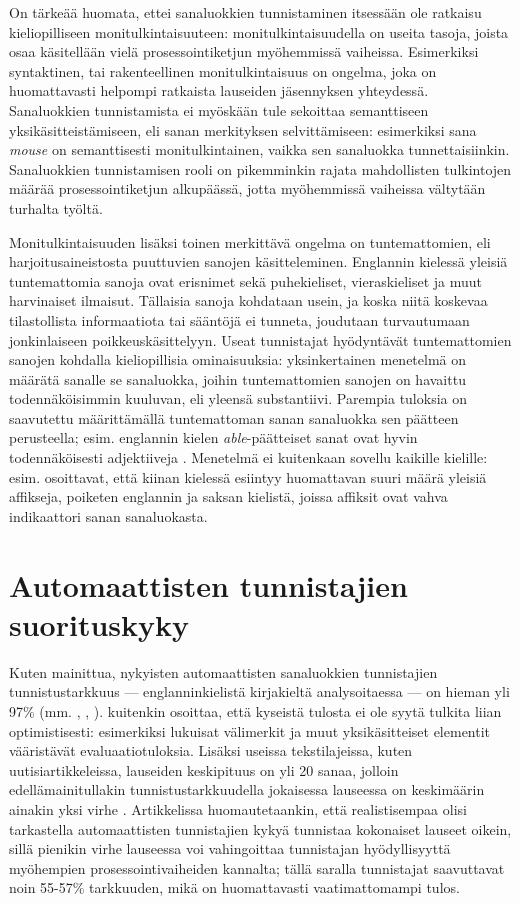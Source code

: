 \documentclass[utf8,bachelor,manualbib]{gradu3}
\begin{document}
On tärkeää huomata, ettei sanaluokkien tunnistaminen itsessään ole ratkaisu kieliopilliseen monitulkintaisuuteen: monitulkintaisuudella on useita tasoja, joista osaa käsitellään vielä prosessointiketjun myöhemmissä vaiheissa. Esimerkiksi syntaktinen, tai rakenteellinen monitulkintaisuus on ongelma, joka on huomattavasti helpompi ratkaista lauseiden jäsennyksen yhteydessä. Sanaluokkien tunnistamista ei myöskään tule sekoittaa semanttiseen yksikäsitteistämiseen, eli sanan merkityksen selvittämiseen: esimerkiksi sana \textit{mouse} on semanttisesti monitulkintainen, vaikka sen sanaluokka tunnettaisiinkin. Sanaluokkien tunnistamisen rooli on pikemminkin rajata mahdollisten tulkintojen määrää prosessointiketjun alkupäässä, jotta myöhemmissä vaiheissa vältytään turhalta työltä.

Monitulkintaisuuden lisäksi toinen merkittävä ongelma on tuntemattomien, eli harjoitusaineistosta puuttuvien sanojen käsitteleminen. Englannin kielessä yleisiä tuntemattomia sanoja ovat erisnimet sekä puhekieliset, vieraskieliset ja muut harvinaiset ilmaisut. Tällaisia sanoja kohdataan usein, ja koska niitä koskevaa tilastollista informaatiota tai sääntöjä ei tunneta, joudutaan turvautumaan jonkinlaiseen poikkeuskäsittelyyn. Useat tunnistajat hyödyntävät tuntemattomien sanojen kohdalla kieliopillisia ominaisuuksia: yksinkertainen menetelmä on määrätä sanalle se sanaluokka, joihin tuntemattomien sanojen on havaittu todennäköisimmin kuuluvan, eli yleensä substantiivi. Parempia tuloksia on saavutettu määrittämällä tuntemattoman sanan sanaluokka sen päätteen perusteella; esim. englannin kielen \emph{able}-päätteiset sanat ovat hyvin todennäköisesti adjektiiveja \citep{samuelsson1993}. Menetelmä ei kuitenkaan sovellu kaikille kielille: esim. \citet{tseng2005} osoittavat, että kiinan kielessä esiintyy huomattavan suuri määrä yleisiä affikseja, poiketen englannin ja saksan kielistä, joissa affiksit ovat vahva indikaattori sanan sanaluokasta.


\section{Automaattisten tunnistajien suorituskyky}

Kuten mainittua, nykyisten automaattisten sanaluokkien tunnistajien tunnistustarkkuus --- englanninkielistä kirjakieltä analysoitaessa --- on hieman yli 97\%  (mm. \citealp{toutanova2003}, \citealp{shen2007}, \citealp{spoustova2009}). \citet{manning2011} kuitenkin osoittaa, että kyseistä tulosta ei ole syytä tulkita liian optimistisesti: esimerkiksi lukuisat välimerkit ja muut yksikäsitteiset elementit vääristävät evaluaatiotuloksia. Lisäksi useissa tekstilajeissa, kuten uutisiartikkeleissa, lauseiden keskipituus on yli 20 sanaa, jolloin edellämainitullakin tunnistustarkkuudella jokaisessa lauseessa on keskimäärin ainakin yksi virhe \citep{manning1999}. Artikkelissa huomautetaankin, että realistisempaa olisi tarkastella automaattisten tunnistajien kykyä tunnistaa kokonaiset lauseet oikein, sillä pienikin virhe lauseessa voi vahingoittaa tunnistajan hyödyllisyyttä myöhempien prosessointivaiheiden kannalta; tällä saralla tunnistajat saavuttavat noin 55-57\% tarkkuuden, mikä on huomattavasti vaatimattomampi tulos.
\end{document}
